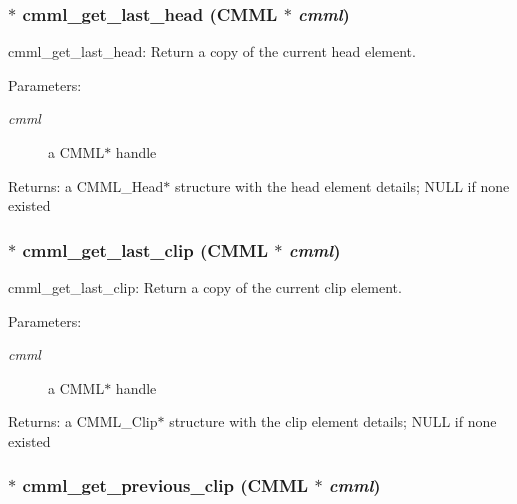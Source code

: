 \subsubsection{$\ast$ cmml\_\-get\_\-last\_\-head ({\bf CMML} $\ast$ {\em cmml})}\label{cmml_8h_a46}


cmml\_\-get\_\-last\_\-head: Return a copy of the current head element.

\begin{Desc}
\item[Parameters:]
\begin{description}
\item[{\em cmml}]a CMML$\ast$ handle\end{description}
\end{Desc}
\begin{Desc}
\item[Returns:]a CMML\_\-Head$\ast$ structure with the head element details; NULL if none existed \end{Desc}
\subsubsection{$\ast$ cmml\_\-get\_\-last\_\-clip ({\bf CMML} $\ast$ {\em cmml})}\label{cmml_8h_a47}


cmml\_\-get\_\-last\_\-clip: Return a copy of the current clip element.

\begin{Desc}
\item[Parameters:]
\begin{description}
\item[{\em cmml}]a CMML$\ast$ handle\end{description}
\end{Desc}
\begin{Desc}
\item[Returns:]a CMML\_\-Clip$\ast$ structure with the clip element details; NULL if none existed \end{Desc}
\subsubsection{$\ast$ cmml\_\-get\_\-previous\_\-clip ({\bf CMML} $\ast$ {\em cmml})}\label{cmml_8h_a48}


